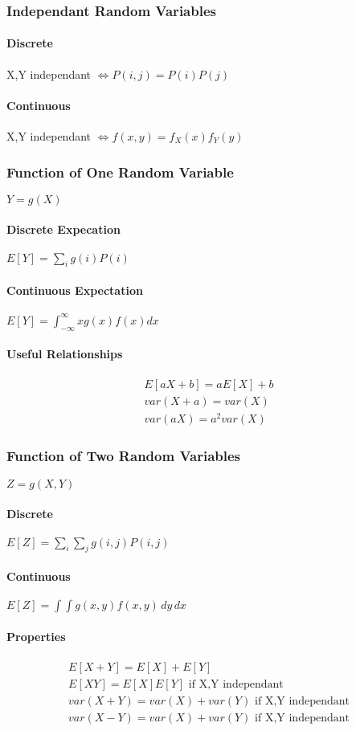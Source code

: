 \subsubsection{Independant Random Variables}
\paragraph{Discrete} X,Y independant $\iff P(i,j) = P(i)P(j)$
\paragraph{Continuous} X,Y independant $\iff f(x,y) = f_X(x) f_Y(y)$
\subsubsection{Function of One Random Variable}
$Y= g(X)$
\paragraph{Discrete Expecation}
$E[Y] = \sum_i g(i)P(i)$
\paragraph{Continuous Expectation}
$E[Y] = \int_{-\infty}^{\infty} x g(x) f(x) dx$
\paragraph{Useful Relationships}
\begin{align*}
	E[aX+b] = aE[X] + b \\
	var(X+a) = var(X) \\
	var(aX) = a^2 var(X)
\end{align*}
\subsubsection{Function of Two Random Variables}
$Z =g(X,Y)$
\paragraph{Discrete}
$E[Z] = \sum_i \sum_j g(i,j) P(i,j)$
\paragraph{Continuous}
$E[Z] = \int \int g(x,y) f(x,y) \, dy \, dx$
\paragraph{Properties}
\begin{align*}
	E[X+Y] = E[X] + E[Y] \\
	E[XY] = E[X]E[Y] \mbox { if X,Y independant} \\
	var(X+Y) = var(X) + var(Y) \mbox { if X,Y independant} \\
	var(X-Y) = var(X) + var(Y) \mbox { if X,Y independant}
\end{align*}

